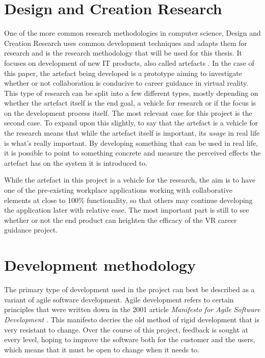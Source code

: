 \section{Design and Creation Research}
\label{sec:designCreationResearch}
One of the more common research methodologies in computer science, Design and Creation Research uses common development techniques and adapts them for research and is the research methodology that will be used for this thesis. It focuses on development of new IT products, also called artefacts \cite{oates2005researching}. In the case of this paper, the artefact being developed is a prototype aiming to investigate whether or not collaboration is conducive to career guidance in virtual reality. This type of research can be split into a few different types, mostly depending on whether the artefact itself is the end goal, a vehicle for research or if the focus is on the development process itself. The most relevant case for this project is the second case. To expand upon this slightly, to say that the artefact is a vehicle for the research means that while the artefact itself is important, its \textit{usage} in real life is what's really important. By developing something that can be used in real life, it is possible to point to something concrete and measure the perceived effects the artefact has on the system it is introduced to.

While the artefact in this project is a vehicle for the research, the aim is to have one of the pre-existing workplace applications working with collaborative elements at close to 100\% functionality, so that others may continue developing the application later with relative ease. The most important part is still to see whether or not the end product can heighten the efficacy of the VR career guidance project.


\section{Development methodology}
The primary type of development used in the project can best be described as a variant of agile software development. Agile development refers to certain principles that were written down in the 2001 article \textit{Manifesto for Agile Software Development} \cite{beck2001manifesto}. This manifesto decries the old method of rigid development that is very resistant to change. Over the course of this project, feedback is sought at every level, hoping to improve the software both for the customer and the users, which means that it must be open to change when it needs to.

